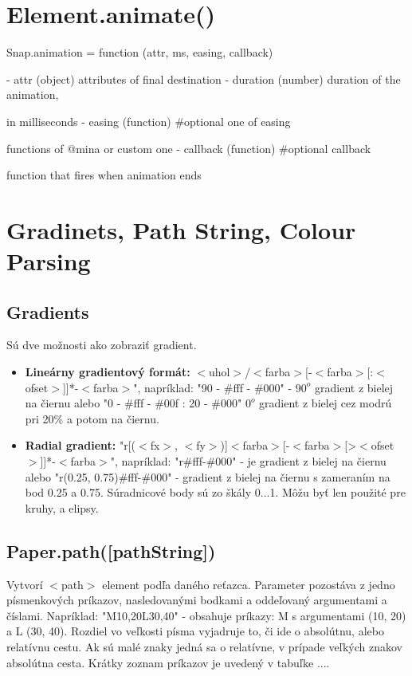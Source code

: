 \section{Element.animate()}
 Snap.animation = function (attr, ms, easing, callback) 

- attr (object) attributes of final destination
- duration (number) duration of the animation, 

in milliseconds
- easing (function) \#optional one of easing 

functions of @mina or custom one
- callback (function) \#optional callback 

function that fires when animation ends


\section{Gradinets, Path String, Colour Parsing}
\subsection{Gradients}
Sú dve možnosti ako zobraziť gradient.
\begin{itemize}
	\item \textbf{Lineárny gradientový formát: } $<$uhol$>$/$<$farba$>$[-$<$farba$>$[:$<$ofset$>$]]*-$<$farba$>$", napríklad: "90 - \#fff - \#000" - $90^o$ gradient z bielej na čiernu
	alebo "0 - \#fff - \#00f : 20 - \#000" $0^o$ gradient z bielej cez modrú pri  20\% a potom na čiernu. 
	\item \textbf{Radial gradient: }"r[($<$fx$>$, $<$fy$>$)]$<$farba$>$[-$<$farba$>$[>$<$ofset$>$]]*-$<$farba$>$", napríklad: "r\#fff-\#000" - je gradient z bielej na čiernu alebo "r(0.25, 0.75)\#fff-\#000" - gradient z bielej na čiernu s zameraním na bod 0.25 a 0.75. Súradnicové body sú zo škály 0...1. Môžu byť len použité pre kruhy, a elipsy.
\end{itemize}


\subsection{Paper.path([pathString])}
Vytvorí $<$path$>$ element podľa daného reťazca. Parameter pozostáva z jedno písmenkových príkazov, nasledovanými bodkami a oddeľovaný argumentami a číslami. 
Napríklad: "M10,20L30,40" - obsahuje príkazy: M s argumentami (10, 20) a L (30, 40). Rozdiel vo veľkosti písma vyjadruje to, či ide o absolútnu, alebo relatívnu cestu. Ak sú malé znaky jedná sa o relatívne, v prípade veľkých znakov absolútna cesta. 
Krátky zoznam príkazov je uvedený v tabuľke ....

